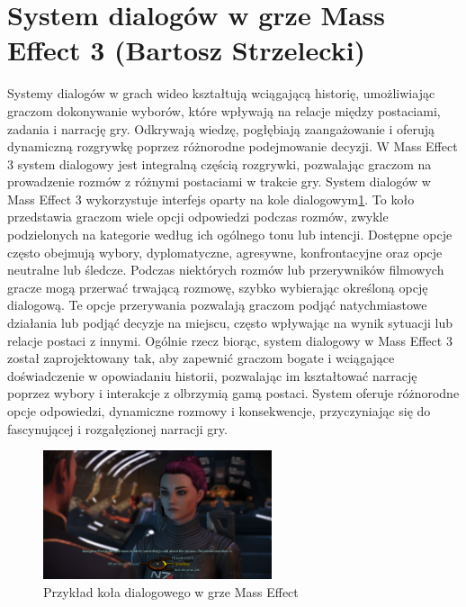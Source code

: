 \section{System dialogów w grze Mass Effect 3 (Bartosz Strzelecki)}
Systemy dialogów w grach wideo kształtują wciągającą historię, umożliwiając graczom dokonywanie wyborów, które wpływają na relacje między postaciami, zadania i narrację gry. 
Odkrywają wiedzę, pogłębiają zaangażowanie i oferują dynamiczną rozgrywkę poprzez różnorodne podejmowanie decyzji.
W Mass Effect 3 system dialogowy jest integralną częścią rozgrywki, pozwalając graczom na prowadzenie rozmów z różnymi postaciami w trakcie gry.
System dialogów w Mass Effect 3 wykorzystuje interfejs oparty na kole dialogowym\ref{fig:wheel}.
To koło przedstawia graczom wiele opcji odpowiedzi podczas rozmów, zwykle podzielonych na kategorie według ich ogólnego tonu lub intencji.
Dostępne opcje często obejmują wybory, dyplomatyczne, agresywne, konfrontacyjne oraz opcje neutralne lub śledcze.
Podczas niektórych rozmów lub przerywników filmowych gracze mogą przerwać trwającą rozmowę, szybko wybierając określoną opcję dialogową.
Te opcje przerywania pozwalają graczom podjąć natychmiastowe działania lub podjąć decyzje na miejscu, często wpływając na wynik sytuacji lub relacje postaci z innymi.
Ogólnie rzecz biorąc, system dialogowy w Mass Effect 3 został zaprojektowany tak, aby zapewnić graczom bogate i wciągające doświadczenie w opowiadaniu historii,
pozwalając im kształtować narrację poprzez wybory i interakcje z olbrzymią gamą postaci. System oferuje różnorodne opcje odpowiedzi, dynamiczne rozmowy i konsekwencje,
przyczyniając się do fascynującej i rozgałęzionej narracji gry.

\begin{figure}[h]
\centering
\includegraphics[width=0.6\textwidth]{images/me}
\caption{Przykład koła dialogowego w grze Mass Effect}
\label{fig:wheel}
\end{figure}
